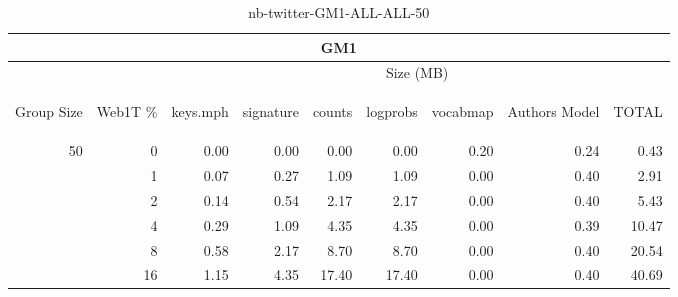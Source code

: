 \begin{center}
\begin{table}[htbp]
\begin{tabular}{ | r | r | r | r | r | r | r | r | r |}
\hline
\multicolumn{9}{|c|}{GM1}\\
\hline
 & & \multicolumn{7}{|c|}{Size (MB)}\\ \cline{3-9}
\begin{sideways}Group Size\end{sideways} & \begin{sideways}Web1T \% \end{sideways} & \begin{sideways}keys.mph\end{sideways} & \begin{sideways}signature\end{sideways} & \begin{sideways}counts\end{sideways} & \begin{sideways}logprobs\end{sideways} & \begin{sideways}vocabmap\end{sideways} & \begin{sideways}Authors Model \end{sideways} & \begin{sideways}TOTAL\end{sideways}\\
\hline
\multirow{5}{*}{50}
 & 0 & 0.00 & 0.00 & 0.00 & 0.00 & 0.20 & 0.24 & 0.43\\ \cline{2-9}
 & 1 & 0.07 & 0.27 & 1.09 & 1.09 & 0.00 & 0.40 & 2.91\\ \cline{2-9}
 & 2 & 0.14 & 0.54 & 2.17 & 2.17 & 0.00 & 0.40 & 5.43\\ \cline{2-9}
 & 4 & 0.29 & 1.09 & 4.35 & 4.35 & 0.00 & 0.39 & 10.47\\ \cline{2-9}
 & 8 & 0.58 & 2.17 & 8.70 & 8.70 & 0.00 & 0.40 & 20.54\\ \cline{2-9}
 & 16 & 1.15 & 4.35 & 17.40 & 17.40 & 0.00 & 0.40 & 40.69\\ \cline{2-9}
\hline
\end{tabular}
\caption{nb-twitter-GM1-ALL-ALL-50}
\label{table:nb-twitter-GM1-ALL-ALL-50}
\end{table}
\end{center}

